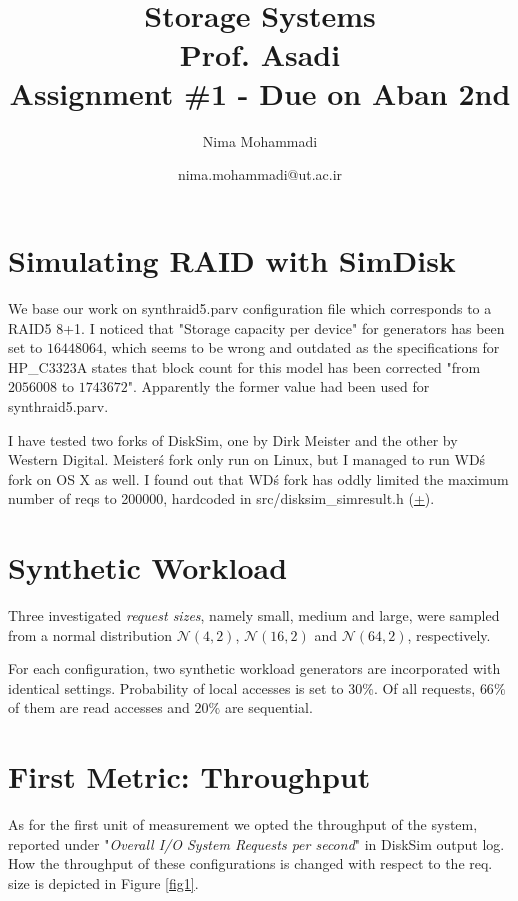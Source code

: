 \documentclass[paper=a4, fontsize=11pt]{scrartcl} %
\title{	
\normalfont \normalsize 
\textsc{} \\ [25pt] %
\horrule{0.5pt} \\[0.4cm] %
\huge Storage Systems\\ %
\large Prof. Asadi \\
\Large Assignment \#1 - Due on Aban 2nd
\horrule{2pt} \\[0.5cm] %
}
\author{Nima Mohammadi} %
\date{\normalsize nima.mohammadi@ut.ac.ir}
\numberwithin{figure}{section} %
\numberwithin{table}{section} %
\begin{document}
\maketitle %

\section{Simulating RAID with SimDisk}

We base our work on synthraid5.parv configuration file which corresponds to a RAID5 8+1. 
I noticed that "Storage capacity per device" for generators has been set to $16448064$, which seems to be wrong and outdated as the specifications for HP\_C3323A states that block count for this model has been corrected "from $2056008$ to $1743672$". Apparently the former value had been used for synthraid5.parv. 

I have tested two forks of DiskSim, one by Dirk Meister and the other by Western Digital. Meister\'s fork only run on Linux, but I managed to run WD\'s fork on OS X as well. I found out that WD\'s fork has oddly limited the maximum number of reqs to 200000, hardcoded in src/disksim\_simresult.h (\href{https://github.com/westerndigitalcorporation/DiskSim/blob/dc21ab0bd53af26ef1acd8b2b9f8dd842aaa338e/STABLE/DiskSim_Linux_Generic_2.01.016/src/disksim_simresult.h#L64}{+}).

\section{Synthetic Workload}
Three investigated \textit{request sizes}, namely small, medium and large, were sampled from a normal distribution $\mathcal{N}(4, 2)$, $\mathcal{N}(16, 2)$ and $\mathcal{N}(64, 2)$, respectively.

For each configuration, two synthetic workload generators are incorporated with identical settings. Probability of local accesses is set to $30\%$. Of all requests, $66\%$ of them are read accesses and $20\%$ are sequential.


\section{First Metric: Throughput}
As for the first unit of measurement we opted the throughput of the system, reported under "\textit{Overall I/O System Requests per second}" in DiskSim output log. How the throughput of these configurations is changed with respect to the req. size is depicted in Figure \ref{fig1}.
\end{document}

